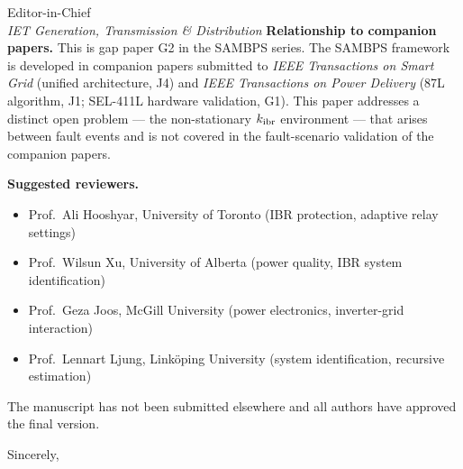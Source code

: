 \documentclass[11pt,a4paper]{letter}
\begin{document}
\begin{letter}{Editor-in-Chief\\
               \textit{IET Generation, Transmission \& Distribution}}
\medskip
\noindent\textbf{Relationship to companion papers.}
This is gap paper G2 in the SAMBPS series.  The SAMBPS framework is developed
in companion papers submitted to \textit{IEEE Transactions on Smart Grid}
(unified architecture, J4) and \textit{IEEE Transactions on Power Delivery}
(87L algorithm, J1; SEL-411L hardware validation, G1).  This paper addresses
a distinct open problem — the non-stationary $k_{\rm ibr}$ environment — that
arises between fault events and is not covered in the fault-scenario validation
of the companion papers.

\medskip
\noindent\textbf{Suggested reviewers.}
\begin{itemize}
  \item Prof.\ Ali Hooshyar, University of Toronto
        (IBR protection, adaptive relay settings)
  \item Prof.\ Wilsun Xu, University of Alberta
        (power quality, IBR system identification)
  \item Prof.\ Geza Joos, McGill University
        (power electronics, inverter-grid interaction)
  \item Prof.\ Lennart Ljung, Linköping University
        (system identification, recursive estimation)
\end{itemize}

\medskip
\noindent
The manuscript has not been submitted elsewhere and all authors have approved
the final version.

\closing{Sincerely,}
\end{letter}
\end{document}

